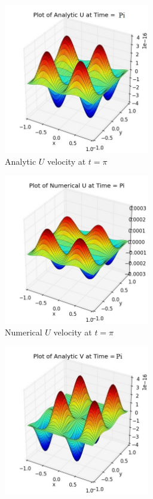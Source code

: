 \begin{figure}[H]
	\centering
	\begin{subfigure}[t]{2.5in}
		\centering
		\includegraphics[width=2.5in]{figures/Pm1b_pf2_U_exact_t_pi_grid_60.jpg}
		\caption{Analytic $U$ velocity at $t=\pi$}\label{fig:6.1a}		
	\end{subfigure}
	\quad
	\begin{subfigure}[t]{2.5in}
		\centering
		\includegraphics[width=2.5in]{figures/Pm1b_pf2_uf_t_pi_grid_60_0_05.jpg}
		\caption{Numerical $U$ velocity at $t=\pi$}\label{fig:6.1b}
	\end{subfigure}
	\quad
	\begin{subfigure}[t]{2.5in}
		\centering
		\includegraphics[width=2.5in]{figures/Pm1b_pf2_V_exact_t_pi_grid_60.jpg}

\end{subfigure}
\end{figure}
